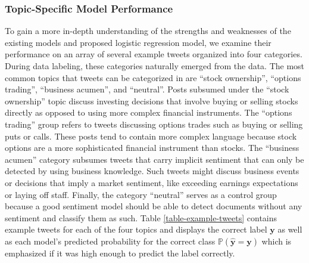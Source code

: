 \subsubsection{Topic-Specific Model Performance}
To gain a more in-depth understanding of the strengths and weaknesses of the existing models and proposed logistic regression model, we examine their performance on an array of several example tweets organized into four categories. During data labeling, these categories naturally emerged from the data. The most common topics that tweets can be categorized in are ``stock ownership'', ``options trading'', ``business acumen'', and ``neutral''. Posts subsumed under the ``stock ownership'' topic discuss investing decisions that involve buying or selling stocks directly as opposed to using more complex financial instruments. The ``options trading'' group refers to tweets discussing options trades such as buying or selling puts or calls. These posts tend to contain more complex language because stock options are a more sophisticated financial instrument than stocks. The ``business acumen'' category subsumes tweets that carry implicit sentiment that can only be detected by using business knowledge. Such tweets might discuss business events or decisions that imply a market sentiment, like exceeding earnings expectations or laying off staff. Finally, the category ``neutral'' serves as a control group because a good sentiment model should be able to detect documents without any sentiment and classify them as such. Table \ref{table-example-tweets} contains example tweets for each of the four topics and displays the correct label $\bm{y}$ as well as each model's predicted probability for the correct class $\bm{\mathbb{P}(\hat y = y)}$ which is emphasized if it was high enough to predict the label correctly.




